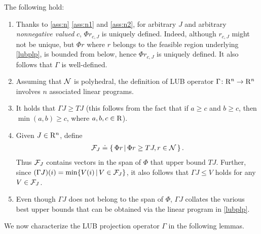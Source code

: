 \begin{remark}\label{lubremark}
The following hold: 
\begin{enumerate}
\item Thanks to \cref{ass:n} \eqref{ass:n1} and \eqref{ass:n2}, 
for arbitrary $J$ and arbitrary \emph{nonnegative valued} $c$,
 $\Phi r_{c,J}$ is uniquely defined.
Indeed, although $r_{c,J}$ might not be unique, but $\Phi r$ where $r$ belongs to the feasible
 region underlying \eqref{lubplp}, is bounded from below, hence  $\Phi r_{c,J}$ is uniquely defined.
It also follows that $\Gamma$ is well-defined.
\item Assuming that $\mathcal{N}$ is polyhedral, 
	the definition of LUB operator $\Gamma \colon \mathrm{R}^n \rightarrow \mathrm{R}^n$ involves $n$ associated linear programs.
\item It holds that $\Gamma J\geq TJ$ (this follows from the fact that if $a\geq c$ and $b\geq c$, then $\min(a,b)\geq c$, where $a, b, c \in \mathrm{R}$).
\item Given $J\in \mathrm{R}^n$, define 
\begin{align*}
\mathcal{F}_J\doteq\{\,\Phi r\,|\,\Phi r\geq TJ, r\in \mathcal{N}\,\}\,.
\end{align*}
Thus $\mathcal{F}_J$ contains vectors in the span of $\Phi$ that upper bound $TJ$. 
Further, since $(\Gamma J)(i) = \min\{ V(i) \,|\, V\in \mathcal{F}_J \}$, it also follows that $\Gamma J \le V$ holds for any $V\in \mathcal{F}_J$.
\item Even though $\Gamma J$ does not belong to the span of $\Phi$, $\Gamma J$ collates the various best upper bounds that can be obtained via the linear program in \eqref{lubplp}.
\begin{comment}
\item The LUB operator $\Gamma$ in \eqref{gamdef} bears close similarity to the ALP in \eqref{alp}.
In fact, it is not hard to observe that $(\Gamma J)(i) = (\Phi r_{e_i})(i)$ for any $1\le i \le n$; the reason $\Gamma$ is defined the way it is so that this resembles to \eqref{alp} will be clear. 
\end{comment}
\end{enumerate}
\end{remark}
We now characterize the LUB projection operator $\Gamma$ in the following lemmas. 

